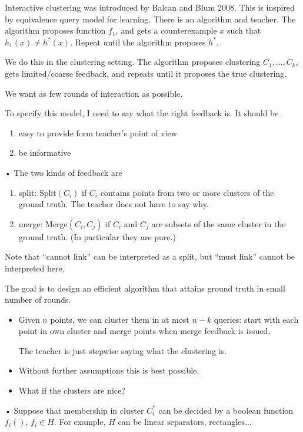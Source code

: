 Interactive clustering was introduced by Balcan and Blum 2008. This is inspired by equivalence query model for learning. There is an algorithm and teacher. The algorithm proposes function $f_1$, and gets a counterexample $x$ such that $h_1(x)\ne h^*(x)$. Repeat until the algorithm proposes $h^*$.

We do this in the clustering setting. The algorithm proposes clustering $C_1,\ldots, C_k$, gets limited/coarse feedback, and repeats until it proposes the true clustering.

We want as few rounds of interaction as possible.

To specify this model, I need to say what the right feedback is. It should be
\begin{enumerate}
\item
easy to provide form teacher's point of view
\item
be informative
\end{enumerate}•
The two kinds of feedback are 
\begin{enumerate}
\item
split: Split$(C_i)$ if $C_i$ contains points from two or more clusters of the ground truth. The teacher does not have to say why.
\item
merge: Merge$(C_i,C_j)$ if $C_i$ and $C_j$ are subsets of the same cluster in the ground truth. (In particular they are pure.)
\end{enumerate}
Note that ``cannot link'' can be interpreted as a split, but ``must link'' cannot be interpreted here.

The goal is to design an efficient algorithm that attains ground truth in small number of rounds.
\begin{itemize}
\item
Given $n$ points, we can cluster them in at most $n-k$ queries: start with each point in own cluster and merge points when merge feedback is issued.

The teacher is just stepwise saying what the clustering is.
\item
Without further assumptions this is best possible.
\item
What if the clusters are nice?
%
\end{itemize}•
Suppose that membership in cluster $C_i^*$ can be decided by a boolean function $f_i()$, $f_i\in H$. For example, $H$ can be linear separators, rectangles...


